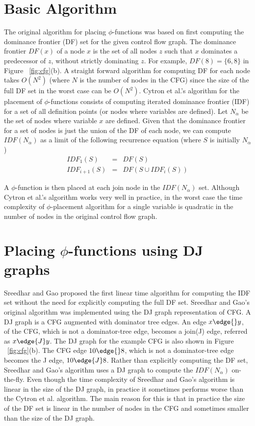 \section{Basic Algorithm}
The original algorithm for placing $\phi$-functions
was based on first computing the dominance frontier  (DF) set for the given control flow graph.
The dominance frontier $DF(x)$ of a node $x$ is the set of all nodes 
 $z$ such that $x$ dominates a predecessor of $z$, without strictly dominating $z$.
For example, $DF(8)= \{ 6, 8 \}$ in Figure ~\ref{fig:cfg}(b). A straight forward algorithm for computing
DF for each node takes $O(N^2)$ (where $N$ is the number of nodes in the CFG) since the size of the full DF set in the worst case
can be $O(N^2)$.
Cytron et al.'s algorithm for the placement of $\phi$-functions consists of computing
iterated dominance frontier (IDF) for a set of all definition points (or nodes where
variables are defined). 
Let $N_{\alpha}$ be the set of nodes where variable $x$ are  defined.
Given that the dominance frontier for a set of nodes is just the
union of the DF of each node, we can compute $IDF(N_\alpha)$ as a limit of
the following recurrence equation (where $S$ is initially $N_\alpha$)
\begin{eqnarray*}
IDF_1(S) &=& DF(S) \\
IDF_{i+1} (S) &=& DF(S \cup IDF_i(S)) 
\end{eqnarray*}

A $\phi$-function is then placed at each join node in the  $IDF(N_{\alpha})$ set. 
Although Cytron et al.'s
algorithm works very well in practice, in the worst case the time complexity of $\phi$-placement algorithm for a single variable is quadratic in the number of nodes in the original control flow graph.




\section{Placing $\phi$-functions using DJ graphs}
Sreedhar and Gao 
proposed the first linear time algorithm for computing the IDF set without
the need for explicitly computing the full DF set. Sreedhar and Gao's original
algorithm was implemented using the DJ graph representation of CFG. A DJ graph
is a CFG augmented with dominator tree edges. An edge $x \edge{} y$, of the
CFG, which is not a dominator-tree edge, becomes a join(J) edge, referred as $x \edge{J} y$. The
DJ graph for the example CFG is also shown in Figure ~\ref{fig:cfg}(b). The CFG edge
$10 \edge{} 8$, which is not a dominator-tree edge becomes the J edge, $10 \edge{J} 8$.
Rather than explicitly
computing the DF set, Sreedhar and Gao's algorithm uses a DJ graph to compute the  $IDF(N_{\alpha})$ on-the-fly. Even though
 the time complexity of
Sreedhar and Gao's algorithm is linear in the size of the DJ graph, in practice it sometimes performs worse than the Cytron et al.
algorithm. The main reason for this is that in practice the size of the DF set is linear in the number of nodes in the CFG 
and sometimes smaller than the size of the DJ graph. 


